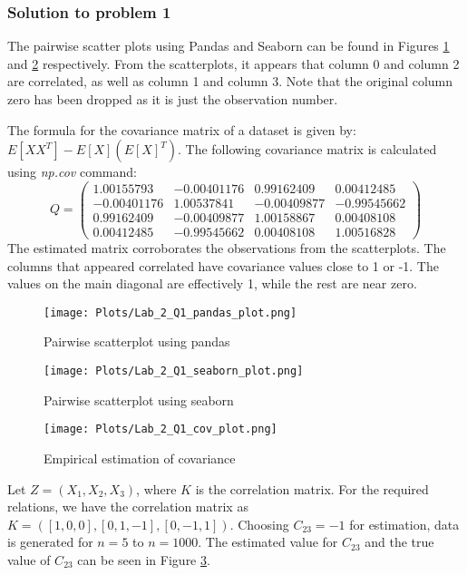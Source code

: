 \documentclass[12pt]{article}%
\begin{document}
\subsubsection{Solution to problem 1}

The pairwise scatter plots using Pandas and Seaborn can be found in Figures \ref{fig:Q1_pandas} and \ref{fig:Q1_seaborn} respectively. From the scatterplots, it appears that column 0 and column 2 are correlated, as well as column 1 and column 3. Note that the original column zero has been dropped as it is just the observation number.

The formula for the covariance matrix of a dataset is given by: $E[XX^T] - E[X](E[X]^T)$. The following covariance matrix is calculated using \emph{np.cov} command:
\begin{equation*}
    Q = \begin{pmatrix}1.00155793 & -0.00401176 & 0.99162409 & 0.00412485\\-0.00401176 & 1.00537841 & -0.00409877 & -0.99545662\\0.99162409 & -0.00409877 & 1.00158867 & 0.00408108\\0.00412485 & -0.99545662 & 0.00408108 & 1.00516828\end{pmatrix}
\end{equation*}
The estimated matrix corroborates the observations from the scatterplots. The columns that appeared correlated have covariance values close to 1 or -1. The values on the main diagonal are effectively 1, while the rest are near zero.\\

\begin{figure}
\texttt{[image: Plots/Lab\_2\_Q1\_pandas\_plot.png]}
\centering
\caption{Pairwise scatterplot using pandas}
\label{fig:Q1_pandas}
\centering
\end{figure}

\begin{figure}
\texttt{[image: Plots/Lab\_2\_Q1\_seaborn\_plot.png]}
\centering
\caption{Pairwise scatterplot using seaborn}
\label{fig:Q1_seaborn}
\centering
\end{figure}

\begin{figure}
\texttt{[image: Plots/Lab\_2\_Q1\_cov\_plot.png]}
\centering
\caption{Empirical estimation of covariance}
\label{fig:Q1_cov}
\centering
\end{figure}

Let $Z = (X_1, X_2, X_3)$, where $K$ is the correlation matrix. For the required relations, we have the correlation matrix as $K = ([1, 0, 0], [0, 1, -1], [0, -1, 1])$. Choosing $C_{23} = -1$ for estimation, data is generated for $n = 5$ to $n = 1000$. The estimated value for $C_{23}$ and the true value of $C_{23}$ can be seen in Figure \ref{fig:Q1_cov}.\\
\end{document}
